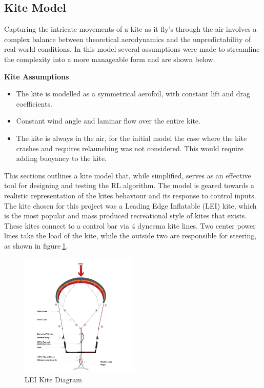 \subsection{Kite Model}\label{sec:Kite}
Capturing the intricate movements of a kite as it fly's through the air involves a complex balance between theoretical aerodynamics and the unpredictability of real-world conditions. In this model several assumptions were made to streamline the complexity into a more manageable form and are shown below.

\textbf{Kite Assumptions}
\begin{itemize}
    \item The kite is modelled as a symmetrical aerofoil, with constant lift and drag coefficients.
    \item Constant wind angle and laminar flow over the entire kite.
    \item The kite is always in the air, for the initial model the case where the kite crashes and requires relaunching was not considered. This would require adding buoyancy to the kite.
\end{itemize}

This sections outlines a kite model that, while simplified, serves as an effective tool for designing and testing the RL algorithm. The model is geared towards a realistic representation of the kites behaviour and its response to control inputs. The kite chosen for this project was a Leading Edge Inflatable (LEI) kite, which is the most popular and mass produced recreational style of kites that exists. These kites connect to a control bar via 4 dyneema kite lines. Two center power lines take the load of the kite, while the outside two are responsible for steering, as shown in figure$~$\ref{kite_diagram}.

\begin{figure}[h]
    \centering
    \includegraphics[width=0.5\textwidth]{Images/kitediagram.jpg}
    \caption{LEI Kite Diagram}\label{kite_diagram}
\end{figure}

